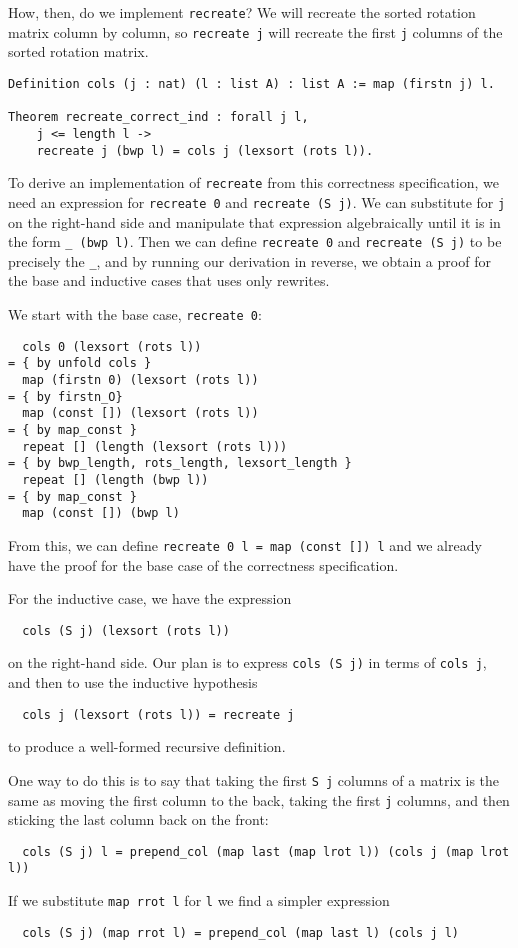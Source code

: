 \documentclass[11pt]{thesis}
\begin{document}
How, then, do we implement \texttt{recreate}? We will recreate the
sorted rotation matrix column by column, so \verb|recreate j| will
recreate the first \verb|j| columns of the sorted rotation matrix.
\begin{verbatim}
Definition cols (j : nat) (l : list A) : list A := map (firstn j) l.

Theorem recreate_correct_ind : forall j l,
    j <= length l ->
    recreate j (bwp l) = cols j (lexsort (rots l)).
\end{verbatim}

To derive an implementation of \verb|recreate| from this correctness
specification, we need an expression for \verb|recreate 0| and
\verb|recreate (S j)|. We can substitute for \verb|j| on the
right-hand side and manipulate that expression algebraically until it
is in the form \verb|_ (bwp l)|. Then we can define \verb|recreate 0|
and \verb|recreate (S j)| to be precisely the \verb|_|, and by
running our derivation in reverse, we obtain a proof for the base and
inductive cases that uses only rewrites.

We start with the base case, \verb|recreate 0|:
\begin{verbatim}
  cols 0 (lexsort (rots l))
= { by unfold cols }
  map (firstn 0) (lexsort (rots l))
= { by firstn_O}
  map (const []) (lexsort (rots l))
= { by map_const }
  repeat [] (length (lexsort (rots l)))
= { by bwp_length, rots_length, lexsort_length }
  repeat [] (length (bwp l))
= { by map_const }
  map (const []) (bwp l)
\end{verbatim}

From this, we can define \verb|recreate 0 l = map (const []) l| and
we already have the proof for the base case of the correctness
specification.

For the inductive case, we have the expression
\begin{verbatim}
  cols (S j) (lexsort (rots l))
\end{verbatim}
on the right-hand side. Our plan is to express \verb|cols (S j)|
in terms of \verb|cols j|, and then to use the inductive hypothesis
\begin{verbatim}
  cols j (lexsort (rots l)) = recreate j
\end{verbatim}
to produce a well-formed recursive definition.

One way to do this is to say that taking the first \verb|S j| columns
of a matrix is the same as moving the first column to the back, taking
the first \verb|j| columns, and then sticking the last column back on
the front:
\begin{verbatim}
  cols (S j) l = prepend_col (map last (map lrot l)) (cols j (map lrot l))
\end{verbatim}
If we substitute \verb|map rrot l| for \verb|l| we find a simpler
expression
\begin{verbatim}
  cols (S j) (map rrot l) = prepend_col (map last l) (cols j l)
\end{verbatim}
\end{document}
